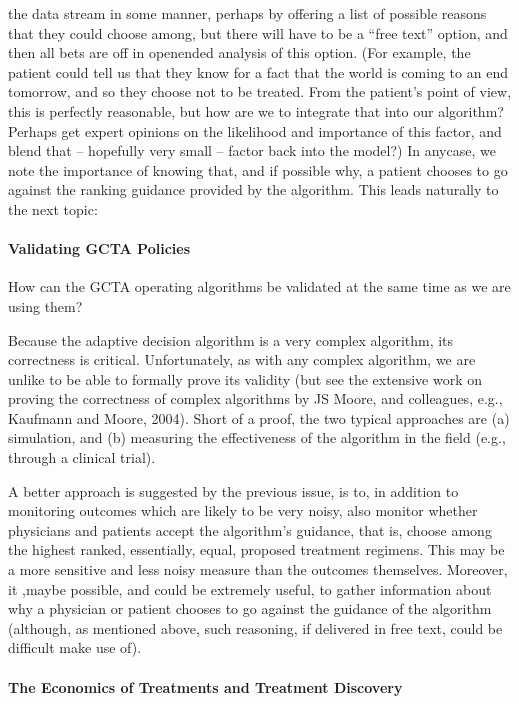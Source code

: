 \documentclass[12pt]{article}
\begin{document}
the data stream in some manner, perhaps by offering a list of possible
reasons that they could choose among, but there will have to be a
“free text” option, and then all bets are off in openended analysis of
this option. (For example, the patient could tell us that they know
for a fact that the world is coming to an end tomorrow, and so they
choose not to be treated. From the patient’s point of view, this is
perfectly reasonable, but how are we to integrate that into our
algorithm? Perhaps get expert opinions on the likelihood and
importance of this factor, and blend that – hopefully very small –
factor back into the model?) In anycase, we note the importance of
knowing that, and if possible why, a patient chooses to go against the
ranking guidance provided by the algorithm. This leads naturally to
the next topic:

\paragraph*{Validating GCTA Policies}

How can the GCTA operating algorithms be validated at the same time as
we are using them?

Because the adaptive decision algorithm is a very complex algorithm,
its correctness is critical. Unfortunately, as with any complex
algorithm, we are unlike to be able to formally prove its validity
(but see the extensive work on proving the correctness of complex
algorithms by JS Moore, and colleagues, e.g., Kaufmann and Moore,
2004). Short of a proof, the two typical approaches are (a)
simulation, and (b) measuring the effectiveness of the algorithm in
the field (e.g., through a clinical trial).

A better approach is suggested by the previous issue, is to, in
addition to monitoring outcomes which are likely to be very noisy,
also monitor whether physicians and patients accept the algorithm’s
guidance, that is, choose among the highest ranked, essentially,
equal, proposed treatment regimens. This may be a more sensitive and
less noisy measure than the outcomes themselves.  Moreover, it ,maybe
possible, and could be extremely useful, to gather information about
why a physician or patient chooses to go against the guidance of the
algorithm (although, as mentioned above, such reasoning, if delivered
in free text, could be difficult make use of).

\paragraph*{The Economics of Treatments and Treatment Discovery}
\end{document}
